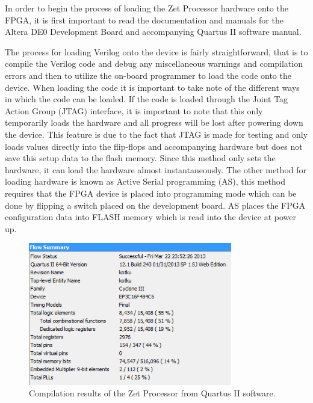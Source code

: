 \documentclass[11pt,peerreview, onecolumn]{IEEEtran}
\begin{document}
In order to begin the process of loading the Zet Processor hardware onto the FPGA, it is first important to read the documentation and manuals for the Altera DE0 Development Board and accompanying Quartus II software manual. 

The process for loading Verilog onto the device is fairly straightforward, that is to compile the Verilog code and debug any miscellaneous warnings and compilation errors and then to utilize the on-board programmer to load the code onto the device. When loading the code it is important to take note of the different ways in which the code can be loaded. If the code is loaded through the Joint Tag Action Group (JTAG) interface, it is important to note that this only temporarily loads the hardware and all progress will be lost after powering down the device. This feature is due to the fact that JTAG is made for testing and only loads values directly into the flip-flops and accompanying hardware but does not save this setup data to the flash memory. Since this method only sets the hardware, it can load the hardware almost instantaneously. The other method for loading hardware is known as Active Serial programming (AS), this method requires that the FPGA device is placed into programming mode which can be done by flipping a switch placed on the development board. AS places the FPGA configuration data into FLASH memory which is read into the device at power up.

\begin{figure}[!h]
\centering
\includegraphics[width=3.5in]{CompileResults}
\caption{Compilation results of the Zet Processor from Quartus II software.}
\label{fig:CompileResults}
\end{figure}
\end{document}
